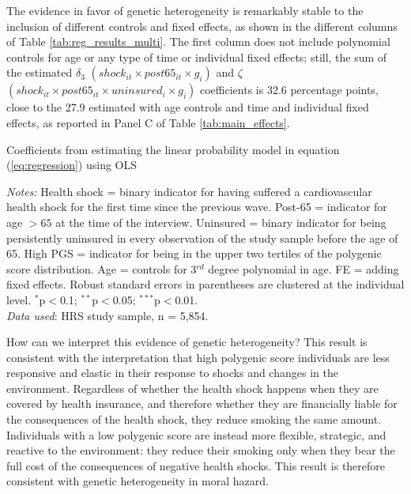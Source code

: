 \documentclass[11pt]{article}
\begin{document}
The evidence in favor of genetic heterogeneity is remarkably stable to the inclusion of different controls and fixed effects, as shown in the different columns of Table \ref{tab:reg_results_multi}.
The first column does not include polynomial controls for age or any type of time or individual fixed effects; still, the sum of the estimated $\delta_3$ $(shock_{it} \times post65_{it} \times g_i)$ and $\zeta$ $(shock_{it} \times post65_{it} \times uninsured_i \times g_i)$ coefficients is 32.6 percentage points, close to the 27.9 estimated with age controls and time and individual fixed effects, as reported in Panel  C of Table \ref{tab:main_effects}.

\begin{table}[!ht] \centering
	\caption{Coefficients from estimating the linear probability model in equation (\ref{eq:regression}) using OLS\vspace{-0.4cm}}
	\addtolength{\tabcolsep}{-7pt}
	\label{tab:reg_results_multi}
	\resizebox{0.55\textheight}{!}{
	
	} %
	\begin{flushleft}
	\textit{Notes:}
	Health shock = binary indicator for having suffered a cardiovascular health shock for the first time since the previous wave.
	Post-65 = indicator for age $> 65$ at the time of the interview.
	Uninsured = binary indicator for being persistently uninsured in every observation of the study sample before the age of 65.
	High PGS = indicator for being in the upper two tertiles of the polygenic score distribution.
    Age = controls for 3$^{rd}$ degree polynomial in age.
    FE = adding fixed effects.
	Robust standard errors in parentheses are clustered at the individual level.
	$^{*}$p$<$0.1; $^{**}$p$<$0.05; $^{***}$p$<$0.01.
	\\ \textit{Data used}: HRS study sample, n = 5,854.
	\end{flushleft}
\end{table}

How can we interpret this evidence of genetic heterogeneity?
This result is consistent with the interpretation that high polygenic score individuals are less responsive and elastic in their response to shocks and changes in the environment.
Regardless of whether the health shock happens when they are covered by health insurance, and therefore whether they are financially liable for the consequences of the health shock, they reduce smoking the same amount.
Individuals with a low polygenic score are instead more flexible, strategic, and reactive to the environment: they reduce their smoking only when they bear the full cost of the consequences of negative health shocks.
This result is therefore consistent with genetic heterogeneity in moral hazard.
\end{document}
